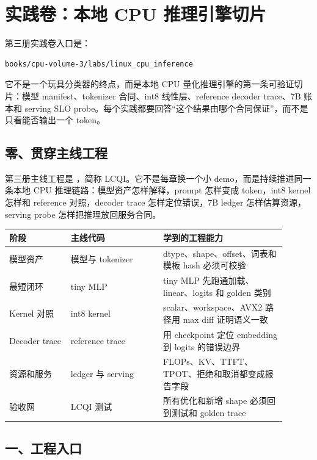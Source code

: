 \chapter{实践卷：本地 CPU 推理引擎切片}

第三册实践卷入口是：

\begin{lstlisting}[language=bash]
books/cpu-volume-3/labs/linux_cpu_inference
\end{lstlisting}

它不是一个玩具分类器的终点，而是本地 CPU 量化推理引擎的第一条可验证切片：模型 manifest、tokenizer 合同、int8 线性层、reference decoder trace、7B 账本和 serving SLO probe。每个实践都要回答“这个结果由哪个合同保证”，而不是只看能否输出一个 token。

\section{零、贯穿主线工程}

第三册主线工程是 ，简称 LCQI。它不是每章换一个小 demo，而是持续推进同一条本地 CPU 推理链路：模型资产怎样解释，prompt 怎样变成 token，int8 kernel 怎样和 reference 对照，decoder trace 怎样定位错误，7B ledger 怎样估算资源，serving probe 怎样把推理放回服务合同。

\begin{longtable}{p{0.20\linewidth}p{0.30\linewidth}p{0.40\linewidth}}
阶段 & 主线代码 & 学到的工程能力 \\
\hline
模型资产 & 模型与 tokenizer & dtype、shape、offset、词表和模板 hash 必须可校验 \\
最短闭环 & tiny MLP & tiny MLP 先跑通加载、linear、logits 和 golden 类别 \\
Kernel 对照 & int8 kernel & scalar、workspace、AVX2 路径用 max diff 证明语义一致 \\
Decoder trace & reference trace & 用 checkpoint 定位 embedding 到 logits 的错误边界 \\
资源和服务 & ledger 与 serving & FLOPs、KV、TTFT、TPOT、拒绝和取消都变成报告字段 \\
验收网 & LCQI 测试 & 所有优化和新增 shape 必须回到测试和 golden trace \\
\end{longtable}

\section{一、工程入口}

